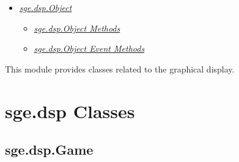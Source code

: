 \documentclass[letterpaper,10pt,english]{sphinxmanual}
\begin{document}
{\begin{minipage}{0.95\linewidth}
\begin{itemize}
\begin{itemize}
\begin{itemize}
\begin{itemize}
\end{itemize}

\item {} 
\label{dsp:id11}{\hyperref[dsp:sge\string-dsp\string-object]{\emph{sge.dsp.Object}}}
\begin{itemize}
\item {} 
\label{dsp:id12}{\hyperref[dsp:sge\string-dsp\string-object\string-methods]{\emph{sge.dsp.Object Methods}}}

\item {} 
\label{dsp:id13}{\hyperref[dsp:sge\string-dsp\string-object\string-event\string-methods]{\emph{sge.dsp.Object Event Methods}}}

\end{itemize}

\end{itemize}

\end{itemize}

\end{itemize}
\end{minipage}}
\begin{center}\setlength{\fboxsep}{5pt}\end{center}
\label{dsp:module-sge.dsp}
This module provides classes related to the graphical display.


\section{sge.dsp Classes}
\label{dsp:sge-dsp-classes}

\subsection{sge.dsp.Game}
\label{dsp:sge-dsp-game}
\end{document}
